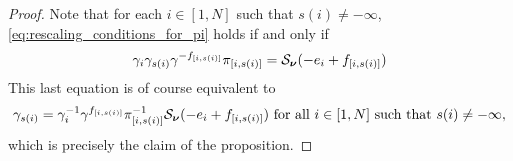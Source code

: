 \begin{proof}

	Note that for each $i \in [1, N]$ such that $s(i) \neq -\infty$,
	\cref{eq:rescaling_conditions_for_pi} holds if and only if
	\begin{equation*}
		\gamma_i \gamma_{s(i)} \gamma^{-f_{[i, s(i)]}}\pi_{[i, s(i)]} = \mathcal{S}_{\boldsymbol{\nu}}(-e_i + f_{[i, s(i)]})
	\end{equation*}
	This last equation is of course equivalent to
	\begin{equation*}
		\gamma_{s(i)} =  \gamma_{i}^{-1} \gamma^{f_{[i, s(i)]}}\pi_{[i, s(i)]}^{-1} \mathcal{S}_{\boldsymbol{\nu}}(-e_i + f_{[i, s(i)]}) \text{ for all } i \in [1, N] \text{ such that } s(i) \neq -\infty,
	\end{equation*}
	which is precisely the claim of the proposition.
\end{proof}

